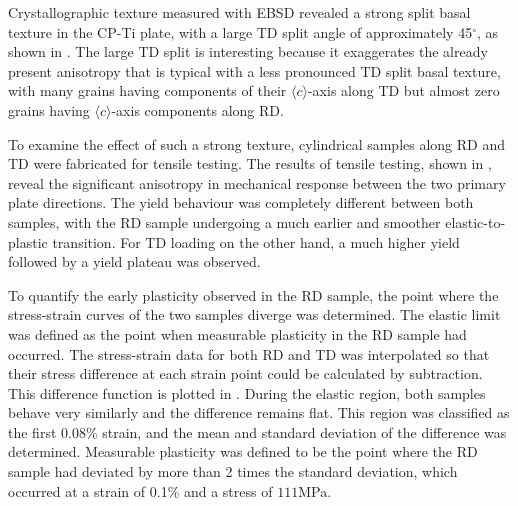 Crystallographic texture measured with EBSD revealed a strong split basal texture in the CP-Ti plate, with a large TD split angle of approximately 45$^\circ$, as shown in .
The large TD split is interesting because it exaggerates the already present anisotropy that is typical with a less pronounced TD split basal texture, with many grains having components of their $\langle c \rangle$-axis along TD but almost zero grains having $\langle c \rangle$-axis components along RD.

To examine the effect of such a strong texture, cylindrical samples along RD and TD were fabricated for tensile testing.
The results of tensile testing, shown in , reveal the significant anisotropy in mechanical response between the two primary plate directions.
The yield behaviour was completely different between both samples, with the RD sample undergoing a much earlier and smoother elastic-to-plastic transition.
For TD loading on the other hand, a much higher yield followed by a yield plateau was observed.

To quantify the early plasticity observed in the RD sample, the point where the stress-strain curves of the two samples diverge was determined.
The elastic limit was defined as the point when measurable plasticity in the RD sample had occurred.
The stress-strain data for both RD and TD was interpolated so that their stress difference at each strain point could be calculated by subtraction.
This difference function is plotted in .
During the elastic region, both samples behave very similarly and the difference remains flat.
This region was classified as the first 0.08\% strain, and the mean and standard deviation of the difference was determined.
Measurable plasticity was defined to be the point where the RD sample had deviated by more than 2 times the standard deviation, which occurred at a strain of 0.1\% and a stress of $111$MPa.

